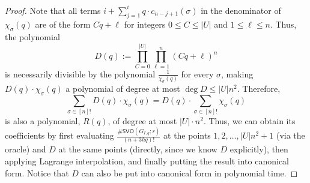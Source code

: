 \documentclass[10pt,a4paper]{amsart}
\begin{document}
\begin{proof}



Note that all terms $i + \sum_{j=1}^i q \cdot c_{n-j+1}(\sigma)$ in the denominator of $\chi_{\sigma}(q)$ are of the form $Cq + \ell$ for integers $0 \leq C \leq |U|$ and $1 \leq \ell \leq n$. Thus, 
the polynomial 
\[
    D(q) := \prod_{C = 0}^{|U|} \prod_{\ell=1}^{n} (Cq + \ell)^n
\]
is necessarily divisible by the polynomial $\frac{1}{\chi_\sigma(q)}$ for every $\sigma$, making $D(q) \cdot \chi_\sigma(q)$ a polynomial of degree at most $\deg D \leq |U|n^2$. Therefore,
\[
    \sum_{\sigma \in [n]!} D(q)\cdot \chi_\sigma(q) = D(q) \cdot \sum_{\sigma \in [n]!} \chi_\sigma(q)
\] is also a polynomial, $R(q)$, of degree at most $|U| \cdot n^2$.  Thus, we can obtain its coefficients by first evaluating $\frac{\#\mathsf{SVO}(G_{I, q}; r)}{(n+3hq)!}$ at the points $1, 2, \ldots, |U|n^2 + 1$ (via the oracle) and $D$ at the same points (directly, since we know $D$ explicitly), then applying Lagrange interpolation, and finally putting the result into canonical form. Notice that $D$ can also be put into canonical form in polynomial time.
\end{proof}
\end{document}
